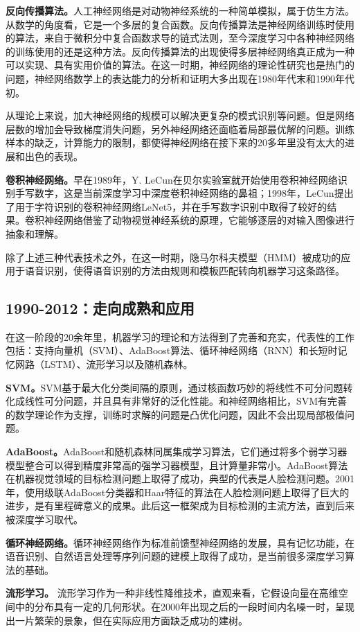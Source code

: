 \textbf{反向传播算法。}人工神经网络是对动物神经系统的一种简单模拟，属于仿生方法。从数学的角度看，它是一个多层的复合函数。反向传播算法是神经网络训练时使用的算法，来自于微积分中复合函数求导的链式法则，至今深度学习中各种神经网络的训练使用的还是这种方法。反向传播算法的出现使得多层神经网络真正成为一种可以实现、具有实用价值的算法。在这一时期，神经网络的理论性研究也是热门的问题，神经网络数学上的表达能力的分析和证明大多出现在1980年代末和1990年代初。

从理论上来说，加大神经网络的规模可以解决更复杂的模式识别等问题。但是网络层数的增加会导致梯度消失问题，另外神经网络还面临着局部最优解的问题。训练样本的缺乏，计算能力的限制，都使得神经网络在接下来的20多年里没有太大的进展和出色的表现。

\textbf{卷积神经网络。}早在1989年，Y. LeCun在贝尔实验室就开始使用卷积神经网络识别手写数字，这是当前深度学习中深度卷积神经网络的鼻祖；1998年，LeCun提出了用于字符识别的卷积神经网络LeNet5，并在手写数字识别中取得了较好的结果。卷积神经网络借鉴了动物视觉神经系统的原理，它能够逐层的对输入图像进行抽象和理解。

除了上述三种代表技术之外，在这一时期，隐马尔科夫模型（HMM）被成功的应用于语音识别，使得语音识别的方法由规则和模板匹配转向机器学习这条路径。

\subsection{1990-2012：走向成熟和应用}
在这一阶段的20余年里，机器学习的理论和方法得到了完善和充实，代表性的工作包括：支持向量机（SVM）、AdaBoost算法、循环神经网络（RNN）和长短时记忆网路（LSTM）、流形学习以及随机森林。

\textbf{SVM。}SVM基于最大化分类间隔的原则，通过核函数巧妙的将线性不可分问题转化成线性可分问题，并且具有非常好的泛化性能。和神经网络相比，SVM有完善的数学理论作为支撑，训练时求解的问题是凸优化问题，因此不会出现局部极值问题。

\textbf{AdaBoost。}AdaBoost和随机森林同属集成学习算法，它们通过将多个弱学习器模型整合可以得到精度非常高的强学习器模型，且计算量非常小。AdaBoost算法在机器视觉领域的目标检测问题上取得了成功，典型的代表是人脸检测问题。2001年，使用级联AdaBoost分类器和Haar特征的算法在人脸检测问题上取得了巨大的进步，是有里程碑意义的成果。此后这一框架成为目标检测的主流方法，直到后来被深度学习取代。

\textbf{循环神经网络。}循环神经网络作为标准前馈型神经网络的发展，具有记忆功能，在语音识别、自然语言处理等序列问题的建模上取得了成功，是当前很多深度学习算法的基础。

\textbf{流形学习。}
流形学习作为一种非线性降维技术，直观来看，它假设向量在高维空间中的分布具有一定的几何形状。在2000年出现之后的一段时间内名噪一时，呈现出一片繁荣的景象，但在实际应用方面缺乏成功的建树。


